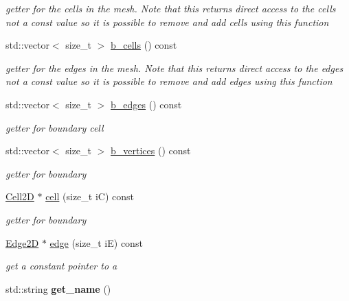 \begin{DoxyCompactItemize}
\begin{DoxyCompactList}\small\item\em getter for the cells in the mesh. Note that this returns direct access to the cells not a const value so it is possible to remove and add cells using this function \end{DoxyCompactList}\item 
std\+::vector$<$ size\+\_\+t $>$ \hyperlink{classMeshFramework2D_1_1Mesh2D_a2dc0b35b47bb7789d4b925cc89a2cd6d}{b\+\_\+cells} () const
\begin{DoxyCompactList}\small\item\em getter for the edges in the mesh. Note that this returns direct access to the edges not a const value so it is possible to remove and add edges using this function \end{DoxyCompactList}\item 
std\+::vector$<$ size\+\_\+t $>$ \hyperlink{classMeshFramework2D_1_1Mesh2D_abab27bb542a2e79830a4e295384767dd}{b\+\_\+edges} () const
\begin{DoxyCompactList}\small\item\em getter for boundary cell \end{DoxyCompactList}\item 
std\+::vector$<$ size\+\_\+t $>$ \hyperlink{classMeshFramework2D_1_1Mesh2D_ac151935a1581c1aa12fa251ed19ca713}{b\+\_\+vertices} () const
\begin{DoxyCompactList}\small\item\em getter for boundary \end{DoxyCompactList}\item 
\hyperlink{classMeshFramework2D_1_1Cell2D}{Cell2D} $\ast$ \hyperlink{classMeshFramework2D_1_1Mesh2D_a1d8c40ea85f0abe3ae5aea23e4a95583}{cell} (size\+\_\+t iC) const
\begin{DoxyCompactList}\small\item\em getter for boundary \end{DoxyCompactList}\item 
\hyperlink{classMeshFramework2D_1_1Edge2D}{Edge2D} $\ast$ \hyperlink{classMeshFramework2D_1_1Mesh2D_a9dd54d7b118e6f645d9af819a7555e93}{edge} (size\+\_\+t iE) const
\begin{DoxyCompactList}\small\item\em get a constant pointer to a \end{DoxyCompactList}\item 
\mbox{\label{classMeshFramework2D_1_1Mesh2D_aa0a6fbd55ae4ccbe922b25215c94e2b7}} 
std\+::string {\bfseries get\+\_\+name} ()
\end{DoxyCompactItemize}


